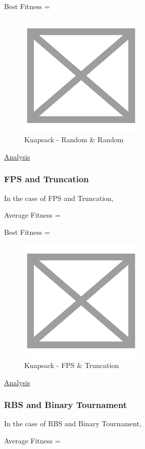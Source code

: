 \documentclass[11pt, letterpaper]{article}
\begin{document}
Best Fitness = 
\begin{figure}[H]
    \centering
    \includegraphics[scale = 0.6]{images/placeHolder.png}
    \caption {Knapsack - Random \& Random}
    \label {fig:kpRR}
\end{figure}

\underline{Analysis}
\subsubsection {FPS and Truncation}
In the case of FPS and Truncation,

Average Fitness = 

Best Fitness = 
\begin{figure}[H]
    \centering
    \includegraphics[scale = 0.6]{images/placeHolder.png}
    \caption {Knapsack - FPS \& Truncation}
    \label {fig:kpFT}
\end{figure}

\underline{Analysis}
\subsubsection {RBS and Binary Tournament}
In the case of RBS and Binary Tournament,

Average Fitness = 
\end{document}
